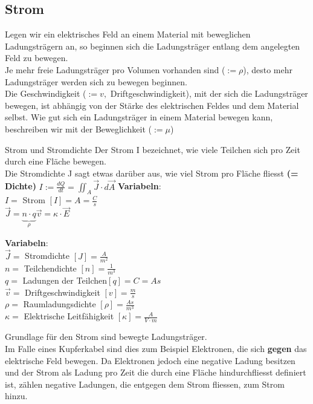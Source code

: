 \subsection{Strom}
\label{chap:Style}
Legen wir ein elektrisches Feld an einem Material mit beweglichen Ladungsträgern an,
so beginnen sich die Ladungsträger entlang dem angelegten Feld zu bewegen. \\
Je mehr freie Ladungsträger pro Volumen vorhanden sind ($:= \rho$), desto mehr Ladungsträger werden sich zu bewegen beginnen. \\
Die Geschwindigkeit ($:= v,$ Driftgeschwindigkeit), mit der sich die Ladungsträger bewegen, ist abhängig von der Stärke des elektrischen Feldes und
dem Material selbst. Wie gut sich ein Ladungsträger in einem Material bewegen kann, beschreiben wir mit der Beweglichkeit ($:= \mu$)


 {Strom und Stromdichte}
\beginip
Der Strom I bezeichnet, wie viele Teilchen sich pro Zeit durch eine Fläche bewegen. \\
Die Stromdichte J sagt etwas darüber aus, wie viel Strom pro Fläche fliesst \textbf{(= Dichte)}
\formulaBegin
$\displaystyle I := \frac{dQ}{dt} = \iint_A \vec{J} \cdot d\vec{A}$
\formulaEnd
\textbf{Variabeln}: \\
$ I = $ Strom $ [I] = A = \frac{C}{s}$ \\

\formulaBegin
$\displaystyle \vec{J} = \underbrace{n\cdot q}_{\rho} \vec{v} = \kappa \cdot \vec{E}$
\formulaEnd

\textbf{Variabeln}: \\
$ \vec{J} = $ Stromdichte $ [J] = \frac{A}{m^2}$ \\
$ n =$ Teilchendichte $ [n] = \frac{1}{m^3}$ \\
$ q =$ Ladungen der Teilchen$ [q] = C = As$ \\
$ \vec{v} = $ Driftgeschwindigkeit $ [v] = \frac{m}{s}$ \\
$ \rho = $ Raumladungsdichte $ [\rho] = \frac{As}{m^3}$ \\
$ \kappa = $ Elektrische Leitfähigkeit $ [\kappa] = \frac{A}{V\cdot m}$
\iend

Grundlage für den Strom sind bewegte Ladungsträger. \\
Im Falle eines Kupferkabel sind dies zum Beispiel Elektronen, die sich \textbf{gegen} das
elektrische Feld bewegen. Da Elektronen jedoch eine negative Ladung besitzen und der Strom als Ladung pro Zeit die durch eine Fläche hindurchfliesst definiert ist, zählen negative Ladungen, die entgegen dem Strom fliessen, zum Strom hinzu.

